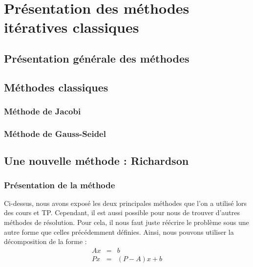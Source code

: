 \chapter{Présentation des méthodes itératives classiques}
\section{Présentation générale des méthodes}
\section{Méthodes classiques}
\subsection{Méthode de Jacobi}
\subsection{Méthode de Gauss-Seidel}
\section{Une nouvelle méthode : Richardson}
\subsection{Présentation de la méthode}
Ci-dessus, nous avons exposé les deux principales méthodes que l'on a utilisé lors des cours et TP. Cependant, il est aussi possible pour nous de trouver d'autres méthodes de résolution. Pour cela, il nous faut juste réécrire le problème sous une autre forme que celles précédemment définies. Ainsi, nous pouvons utiliser la décomposition de la forme :  
\begin{eqnarray}
Ax &=& b\\
Px &=& (P - A)x + b
\end{eqnarray}

